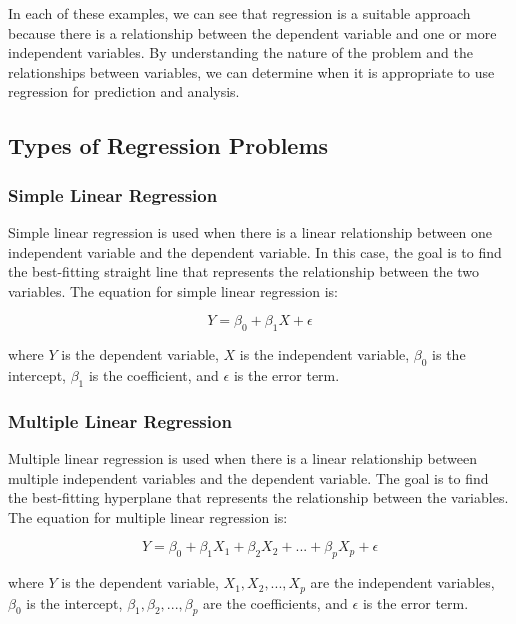 \documentclass{beamer}
\begin{document}
In each of these examples, we can see that regression is a suitable approach because there is a relationship between the dependent variable and one or more independent variables. By understanding the nature of the problem and the relationships between variables, we can determine when it is appropriate to use regression for prediction and analysis.

\subsection{Types of Regression Problems}

\subsubsection{Simple Linear Regression}

Simple linear regression is used when there is a linear relationship between one independent variable and the dependent variable. In this case, the goal is to find the best-fitting straight line that represents the relationship between the two variables. The equation for simple linear regression is:

\begin{equation}
Y = \beta_0 + \beta_1X + \epsilon
\end{equation}

where $Y$ is the dependent variable, $X$ is the independent variable, $\beta_0$ is the intercept, $\beta_1$ is the coefficient, and $\epsilon$ is the error term.

\subsubsection{Multiple Linear Regression}

Multiple linear regression is used when there is a linear relationship between multiple independent variables and the dependent variable. The goal is to find the best-fitting hyperplane that represents the relationship between the variables. The equation for multiple linear regression is:

\begin{equation}
Y = \beta_0 + \beta_1X_1 + \beta_2X_2 + ... + \beta_pX_p + \epsilon
\end{equation}

where $Y$ is the dependent variable, $X_1, X_2, ..., X_p$ are the independent variables, $\beta_0$ is the intercept, $\beta_1, \beta_2, ..., \beta_p$ are the coefficients, and $\epsilon$ is the error term.
\end{document}
